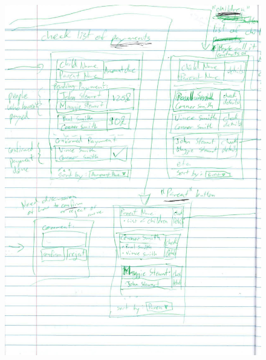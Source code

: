 \documentclass{l3proj}
\begin{document}
{
\begin{figure}[h]
\centering
\includegraphics[scale=0.50]{0085_001-page-007.jpg}
\end{figure}
}

\pagebreak
\end{document}
